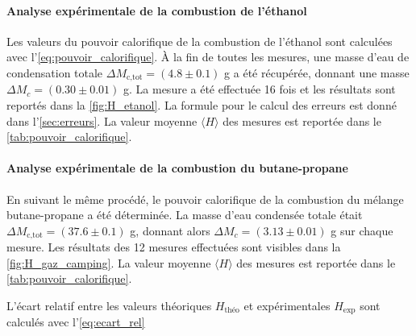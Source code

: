 \paragraph*{Analyse expérimentale de la combustion de l'éthanol}
Les valeurs du pouvoir calorifique de la combustion de l'éthanol sont calculées avec l'\autoref{eq:pouvoir_calorifique}. À la fin de toutes les mesures, une masse d'eau de condensation totale \(\Delta M_\textrm{c,tot} = (4.8 \pm 0.1)\) \si{\gram} a été récupérée, donnant une masse \(\Delta M_c = (0.30 \pm 0.01)\) \si{\gram}. La mesure a été effectuée 16 fois et les résultats sont reportés dans la \autoref{fig:H_etanol}. La formule pour le calcul des erreurs est donné dans l'\autoref{sec:erreurs}. La valeur moyenne \(\langle H \rangle\) des mesures est reportée dans le \autoref{tab:pouvoir_calorifique}.

\paragraph*{Analyse expérimentale de la combustion du butane-propane}
En suivant le même procédé, le pouvoir calorifique de la combustion du mélange butane-propane a été déterminée. La masse d'eau condensée totale était \(\Delta M_\textrm{c,tot} = (37.6 \pm 0.1)\) \si{\gram}, donnant alors \(\Delta M_c = (3.13 \pm 0.01)\) \si{\gram} sur chaque mesure. Les résultats des 12 mesures effectuées sont visibles dans la \autoref{fig:H_gaz_camping}. La valeur moyenne \(\langle H \rangle\) des mesures est reportée dans le \autoref{tab:pouvoir_calorifique}.

L'écart relatif entre les valeurs théoriques \(H_\textrm{théo}\) et expérimentales \(H_\textrm{exp}\) sont calculés avec l'\autoref{eq:ecart_rel}

